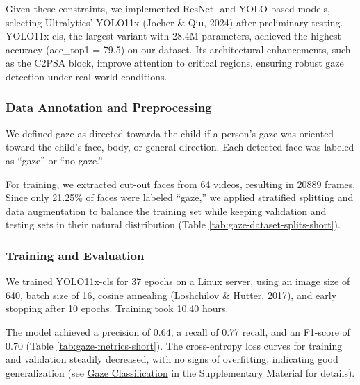 \documentclass[
  man,floatsintext]{apa6}
\begin{document}
Given these constraints, we implemented ResNet- and YOLO-based models, selecting Ultralytics' YOLO11x (Jocher \& Qiu, 2024) after preliminary testing. YOLO11x-cls, the largest variant with 28.4M parameters, achieved the highest accuracy (acc\_top1 = 79.5) on our dataset. Its architectural enhancements, such as the C2PSA block, improve attention to critical regions, ensuring robust gaze detection under real-world conditions.

\subsubsection{Data Annotation and Preprocessing}\label{data-annotation-and-preprocessing}

We defined gaze as directed towarda the child if a person's gaze was oriented toward the child's face, body, or general direction. Each detected face was labeled as ``gaze'' or ``no gaze.''

For training, we extracted cut-out faces from 64 videos, resulting in 20889 frames. Since only 21.25\% of faces were labeled ``gaze,'' we applied stratified splitting and data augmentation to balance the training set while keeping validation and testing sets in their natural distribution (Table \ref{tab:gaze-dataset-splits-short}).

\subsubsection{Training and Evaluation}\label{training-and-evaluation}

We trained YOLO11x-cls for 37 epochs on a Linux server, using an image size of 640, batch size of 16, cosine annealing (Loshchilov \& Hutter, 2017), and early stopping after 10 epochs. Training took 10.40 hours.

The model achieved a precision of 0.64, a recall of 0.77 recall, and an F1-score of 0.70 (Table \ref{tab:gaze-metrics-short}). The cross-entropy loss curves for training and validation steadily decreased, with no signs of overfitting, indicating good generalization (see \hyperref[sup-yolo11x-cls]{Gaze Classification} in the Supplementary Material for details).
\end{document}
